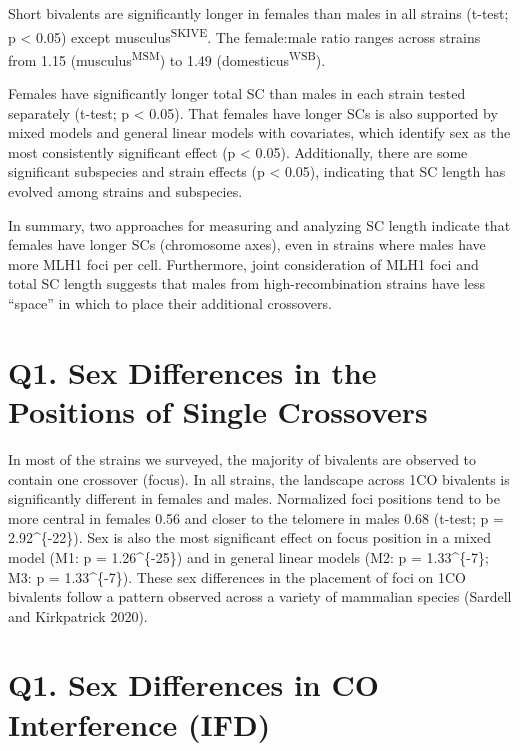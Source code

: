 \documentclass[]{article}
\begin{document}
Short bivalents are significantly longer in females than males in all
strains (t-test; p \textless{} 0.05) except
musculus\textsuperscript{SKIVE}. The female:male ratio ranges across
strains from 1.15 (musculus\textsuperscript{MSM}) to 1.49
(domesticus\textsuperscript{WSB}).

Females have significantly longer total SC than males in each strain
tested separately (t-test; p \textless{} 0.05). That females have longer
SCs is also supported by mixed models and general linear models with
covariates, which identify sex as the most consistently significant
effect (p \textless{} 0.05). Additionally, there are some significant
subspecies and strain effects (p \textless{} 0.05), indicating that SC
length has evolved among strains and subspecies.

In summary, two approaches for measuring and analyzing SC length
indicate that females have longer SCs (chromosome axes), even in strains
where males have more MLH1 foci per cell. Furthermore, joint
consideration of MLH1 foci and total SC length suggests that males from
high-recombination strains have less ``space'' in which to place their
additional crossovers.

\section{Q1. Sex Differences in the Positions of Single
Crossovers}\label{q1.-sex-differences-in-the-positions-of-single-crossovers}

In most of the strains we surveyed, the majority of bivalents are
observed to contain one crossover (focus). In all strains, the landscape
across 1CO bivalents is significantly different in females and males.
Normalized foci positions tend to be more central in females 0.56 and
closer to the telomere in males 0.68 (t-test; p =
2.92\^{}\{-22\}). Sex is also the most significant effect on
focus position in a mixed model (M1: p = 1.26\^{}\{-25\}) and
in general linear models (M2: p = 1.33\^{}\{-7\}; M3: p =
1.33\^{}\{-7\}). These sex differences in the placement of foci
on 1CO bivalents follow a pattern observed across a variety of mammalian
species (Sardell and Kirkpatrick 2020).

\section{Q1. Sex Differences in CO Interference
(IFD)}\label{q1.-sex-differences-in-co-interference-ifd}
\end{document}
